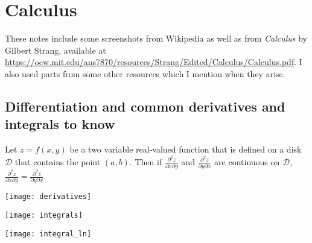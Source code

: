 %
%
%
%
%
%
%
%
%
%
%
%
%
%

\section{Calculus}

These notes include some screenshots from Wikipedia as well as from \textit{Calculus} by Gilbert Strang, available at \url{https://ocw.mit.edu/ans7870/resources/Strang/Edited/Calculus/Calculus.pdf}. I also used parts from some other resources which I mention when they arise.

\subsection{Differentiation and common derivatives and integrals to know}

\begin{theorem}Let \(z = f(x,y)\) be a two variable real-valued function that is defined on a disk \(\mathcal{D}\) that contains the point \((a,b)\). Then if \(\frac{ \partial^2 z}{\partial x \partial y} \) and \(\frac{ \partial^2 z}{\partial y \partial x} \) are continuous on \(\mathcal{D}\),  \(\frac{ \partial^2 z}{\partial x \partial y} = \frac{ \partial^2 z}{\partial y \partial x} \).

\end{theorem}

\texttt{[image: derivatives]}

\texttt{[image: integrals]}

\texttt{[image: integral\_ln]}

